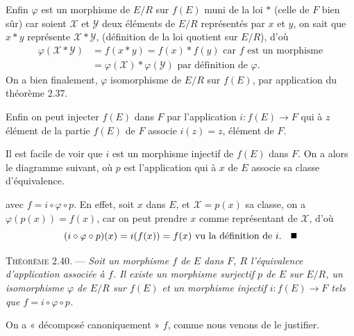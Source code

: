 Enfin $\varphi$ est un morphisme de $E/R$ sur $f(E)$ muni de la loi $*$ (celle de $F$ bien sûr) car soient $\mathcal X$ et $\mathcal Y$ deux éléments de $E/R$ représentés par $x$ et $y$, on sait que $x*y$ représente $\mathcal X*\mathcal Y$, (définition de la loi quotient sur $E/R$), d'où
\begin{align*}
\varphi(\mathcal X*\mathcal Y)&=f(x*y)=f(x)*f(y)\text{ car }f\text{ est un morphisme}\\
&=\varphi(\mathcal X)*\varphi(\mathcal Y)\text{ par définition de }\varphi.
\end{align*}
On a bien finalement, $\varphi$ isomorphisme de $E/R$ sur $f(E)$, par application du théorème 2.37.

Enfin on peut injecter $f(E)$ dans $F$ par l'application $i:f(E)\to F$ qui à $z$ élément de la partie $f(E)$ de $F$ associe $i(z)=z$, élément de $F$.

Il est facile de voir que $i$ est un morphisme injectif de $f(E)$ dans $F$. On a alors le diagramme suivant, où $p$ est l'application qui à $x$ de $E$ associe sa classe d'équivalence.

\begin{center}
\end{center}

avec $f=i\circ\varphi\circ p$. En effet, soit $x$ dans $E$, et $\mathcal X=p(x)$ sa classe, on a $\varphi(p(x))=f(x)$, car on peut prendre $x$ comme représentant de $\mathcal X$, d'où
\[
(i\circ\varphi\circ p)(x)=i(f(x))=f(x)\text{ vu la définition de }i.\quad\bookend
\]

\medskip\noindent\textsc{Théorème 2.40.} --- \emph{Soit un morphisme $f$ de $E$ dans $F$, $R$ l'équivalence d'application associée à $f$. Il existe un morphisme surjectif $p$ de $E$ sur $E/R$, un isomorphisme $\varphi$ de $E/R$ sur $f(E)$ et un morphisme injectif $i:f(E)\to F$ tels que $f=i\circ\varphi\circ p$.}

On a « décomposé canoniquement » $f$, comme nous venons de le justifier.

